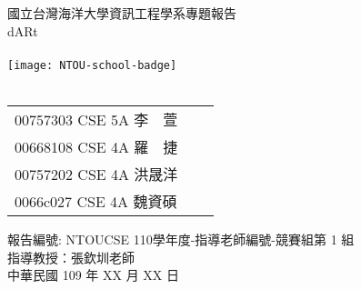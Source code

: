 \documentclass[12pt, a4paper]{report}
\begin{document}
\begin{titlepage}
    \linespread{2} %
    \centering
    \Large 國立台灣海洋大學資訊工程學系專題報告\\
    \LARGE dARt \\
    \ \\
    \texttt{[image: NTOU-school-badge]}\\
   
    \ \\
    \linespread{1}
    \begin{table}[h]
        \large
        \centering
        \begin{tabular}{lll}
            00757303 CSE 5A 李　萱 \\
            00668108 CSE 4A 羅　捷 \\
            00757202 CSE 4A 洪晟洋 \\
            0066c027 CSE 4A 魏資碩 \\
        \end{tabular}
    \end{table}

    \large \hspace{-1cm} 報告編號: NTOUCSE 110學年度-指導老師編號-競賽組第 1 組 \\
    \large 指導教授：張欽圳老師\ \\
    \vspace{3cm}
    \large 中華民國 109 年 XX 月 XX 日

\end{titlepage}

\tableofcontents %








\end{document}
